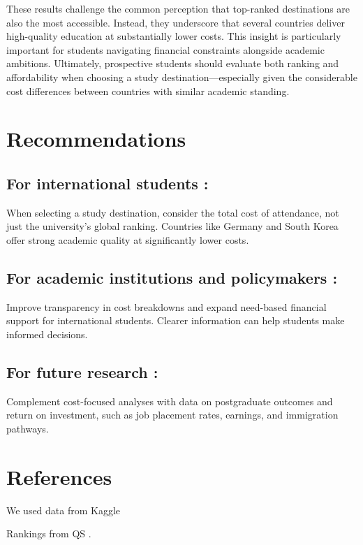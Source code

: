 \documentclass[
  letterpaper,
  DIV=11,
  numbers=noendperiod]{scrartcl}
\begin{document}
These results challenge the common perception that top-ranked
destinations are also the most accessible. Instead, they underscore that
several countries deliver high-quality education at substantially lower
costs. This insight is particularly important for students navigating
financial constraints alongside academic ambitions. Ultimately,
prospective students should evaluate both ranking and affordability when
choosing a study destination---especially given the considerable cost
differences between countries with similar academic standing.

\section{Recommendations}\label{recommendations}

\subsection{For international students
:}\label{for-international-students}

When selecting a study destination, consider the total cost of
attendance, not just the university's global ranking. Countries like
Germany and South Korea offer strong academic quality at significantly
lower costs.

\subsection{⁠For academic institutions and policymakers
:}\label{for-academic-institutions-and-policymakers}

Improve transparency in cost breakdowns and expand need-based financial
support for international students. Clearer information can help
students make informed decisions.

\subsection{For future research :}\label{for-future-research}

Complement cost-focused analyses with data on postgraduate outcomes and
return on investment, such as job placement rates, earnings, and
immigration pathways.

\section{References}\label{references}

We used data from Kaggle \autocite{edu_cost_2024}

Rankings from QS \autocite{qs2024,qs2025}.


\printbibliography
\end{document}
